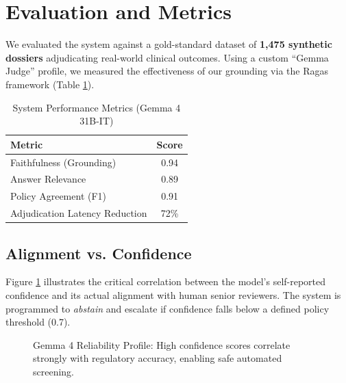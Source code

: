 \documentclass[11pt,a4paper]{article}
\begin{document}
\section{Evaluation and Metrics}
We evaluated the system against a gold-standard dataset of \textbf{1,475 synthetic dossiers} adjudicating real-world clinical outcomes. Using a custom ``Gemma Judge'' profile, we measured the effectiveness of our grounding via the Ragas framework (Table \ref{tab:metrics}).

\begin{table}[h]
\centering
\caption{System Performance Metrics (Gemma 4 31B-IT)}
\label{tab:metrics}
\begin{tabular}{@{}lc@{}}
\toprule
\textbf{Metric} & \textbf{Score} \\ \midrule
Faithfulness (Grounding) & 0.94 \\
Answer Relevance & 0.89 \\
Policy Agreement (F1) & 0.91 \\
Adjudication Latency Reduction & 72\% \\ \bottomrule
\end{tabular}
\end{table}

\subsection{Alignment vs. Confidence}
Figure \ref{fig:plots} illustrates the critical correlation between the model's self-reported confidence and its actual alignment with human senior reviewers. The system is programmed to \textit{abstain} and escalate if confidence falls below a defined policy threshold (0.7).

\begin{figure}[h]
\centering
{}
\caption{Gemma 4 Reliability Profile: High confidence scores correlate strongly with regulatory accuracy, enabling safe automated screening.}
\label{fig:plots}
\end{figure}
\end{document}
